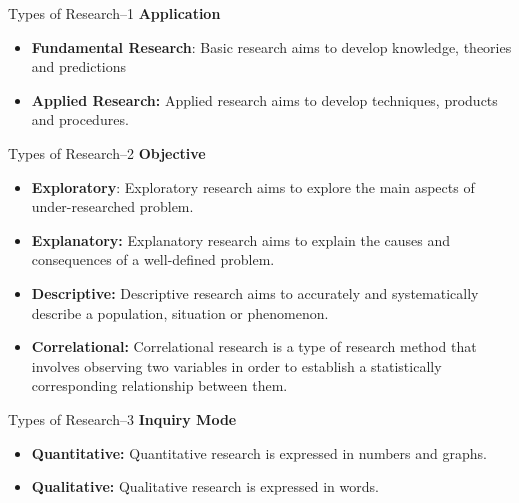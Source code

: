 \begin{frame}[t]{Types of Research--1}
\textbf{Application}
\begin{itemize}
	\item \textbf{Fundamental Research}: Basic research aims to develop 
	knowledge, 
	theories and predictions
	\item \textbf{Applied Research:} Applied research aims to develop 
	techniques, products and procedures.
\end{itemize}
\end{frame}

\begin{frame}[t]{Types of Research--2}
	\textbf{Objective}
	\begin{itemize}
		\item \textbf{Exploratory}:  Exploratory research aims to explore the 
		main 
		aspects of under-researched problem.
		\item \textbf{Explanatory:} Explanatory research aims to explain the 
		causes 
		and consequences of a well-defined problem.
		
		\item \textbf{Descriptive:} Descriptive research aims to accurately and 
		systematically 
		describe a population, situation or phenomenon.
		
		\item \textbf{Correlational:} Correlational research is a type of 
		research 
		method that involves 
		observing two variables in order to establish a statistically 
		corresponding relationship between them.
	\end{itemize}
\end{frame}

\begin{frame}[t]{Types of Research--3}
	\textbf{Inquiry Mode}
	\begin{itemize}
		\item \textbf{Quantitative:} Quantitative research is expressed in 
		numbers and graphs.
		\item \textbf{Qualitative:} Qualitative research is expressed in words.
	\end{itemize}
\end{frame}



